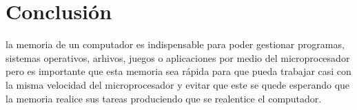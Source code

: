 \documentclass{article}
\begin{document}
\section{Conclusión} \label{conclulsion}

la memoria de un computador es indispensable para poder gestionar programas, sistemas operativos, arhivos, juegos o aplicaciones por medio del microprocesador pero es importante que esta memoria sea rápida para que pueda trabajar casi con la misma velocidad del microprocesador y evitar que este se quede esperando que la memoria realice sus tareas produciendo que se realentice el computador. 

\vspace{0.5cm}



\end{document}
